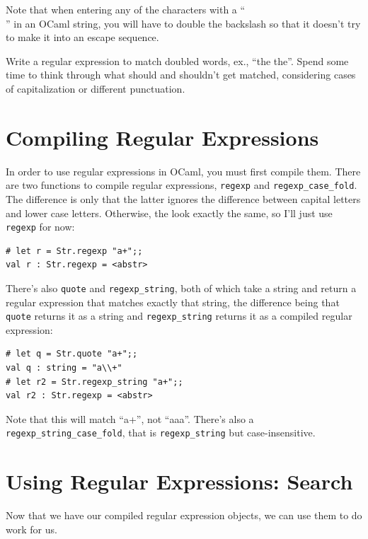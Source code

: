 \documentclass[10pt]{book}
\begin{document}
{Note that when entering any of the characters with a ``\\'' in an OCaml string, you will have to double the backslash so that it doesn't try to make it into an escape sequence.

\begin{ex} \label{ex:regex_doubles}
Write a regular expression to match doubled words, ex., ``the the''. Spend some time to think through what should and shouldn't get matched, considering cases of capitalization or different punctuation.
\end{ex}

\section{Compiling Regular Expressions}

In order to use regular expressions in OCaml, you must first compile them. There are two functions to compile regular expressions, {\tt regexp} and {\tt regexp_case_fold}. The difference is only that the latter ignores the difference between capital letters and lower case letters. Otherwise, the look exactly the same, so I'll just use {\tt regexp} for now:
\beforeverb
\begin{verbatim}
# let r = Str.regexp "a+";;
val r : Str.regexp = <abstr>
\end{verbatim}
\afterverb

There's also {\tt quote} and {\tt regexp_string}, both of which take a string and return a regular expression that matches exactly that string, the difference being that {\tt quote} returns it as a string and {\tt regexp_string} returns it as a compiled regular expression:
\beforeverb
\begin{verbatim}
# let q = Str.quote "a+";;
val q : string = "a\\+"
# let r2 = Str.regexp_string "a+";;
val r2 : Str.regexp = <abstr>
\end{verbatim}
\afterverb
Note that this will match ``a+'', not ``aaa''. There's also a {\tt regexp_string_case_fold}, that is {\tt regexp_string} but case-insensitive.

\section{Using Regular Expressions: Search}

Now that we have our compiled regular expression objects, we can use them to do work for us.

}
\end{document}
